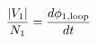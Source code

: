 \documentclass[preview]{standalone}
\begin{document}
\begin{align*}
{|V_1| \over N_1} = {d \phi_{1,\text{loop}} \over d t}
\end{align*}
\end{document}
